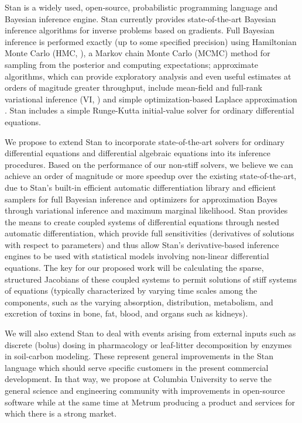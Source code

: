 Stan \citep{carpenter-et-al:2016, stan-development-team:2016,
  mcelreath:2016} is a widely used, open-source, probabilistic
programming language and Bayesian inference engine.  Stan currently
provides state-of-the-art Bayesian inference algorithms for inverse
problems based on gradients.  Full Bayesian inference is performed
exactly (up to some specified precision) using Hamiltonian Monte Carlo
(HMC, \citep{neal:2011}), a Markov chain Monte Carlo (MCMC) method for
sampling from the posterior and computing expectations; approximate
algorithms, which can provide exploratory analysis and even useful
estimates at orders of magitude greater throughput, include mean-field
and full-rank variational inference (VI,
\citep{wainwright-jordan:2008}) and simple optimization-based Laplace
approximation \citep{gelman-et-al:2013}.  Stan includes a simple
Runge-Kutta initial-value solver for ordinary differential equations.

We propose to extend Stan to incorporate state-of-the-art solvers for
ordinary differential equations and differential algebraic equations
into its inference procedures.  Based on the performance of our
non-stiff solvers, we believe we can achieve an order of magnitude or
more speedup over the existing state-of-the-art, due to Stan's
built-in efficient automatic differentiation library and efficient
samplers for full Bayesian inference and optimizers for approximation
Bayes through variational inference and maximum marginal likelihood.
Stan provides the means to create coupled systems of differential
equations through nested automatic differentiation, which provide full
sensitivities (derivatives of solutions with respect to parameters)
\citep{lee-hovland:2002,serban-hindmarsh:2003,carpenter-et-al:2015} and
thus allow Stan's derivative-based inference engines to be used with
statistical models involving non-linear differential equations.  The
key for our proposed work will be calculating the sparse, structured
Jacobians of these coupled systems to permit solutions of stiff
systems of equations (typically characterized by varying time scales
among the components, such as the varying absorption, distribution,
metabolism, and excretion of toxins in bone, fat, blood, and organs
such as kidneys).

We will also extend Stan to deal with events arising from external
inputs such as discrete (bolus) dosing in pharmacology or leaf-litter
decomposition by enzymes in soil-carbon modeling. These represent
general improvements in the Stan language which should serve specific
customers in the present commercial development.  In that way, we
propose at Columbia University to serve the general science and
engineering community with improvements in open-source software while
at the same time at Metrum producing a product and services for which
there is a strong market.


